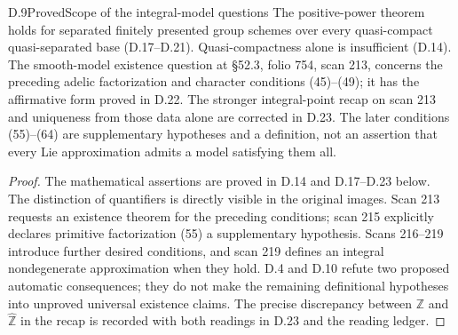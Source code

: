 \begin{statement}{D.9}{Proved}{Scope of the integral-model questions}
The positive-power theorem holds for separated finitely presented
group schemes over every quasi-compact quasi-separated base
(D.17--D.21). Quasi-compactness alone is insufficient (D.14).
The smooth-model existence question at \S52.3, folio 754,
scan 213, concerns the preceding adelic factorization and
character conditions (45)--(49); it has the affirmative form
proved in D.22. The stronger integral-point recap on scan 213
and uniqueness from those data alone are corrected in D.23.
The later conditions (55)--(64) are supplementary hypotheses
and a definition, not an assertion that every Lie approximation
admits a model satisfying them all.
\end{statement}
\begin{proof}
The mathematical assertions are proved in D.14 and D.17--D.23
below. The distinction of quantifiers is directly visible in
the original images. Scan 213 requests an existence theorem
for the preceding conditions; scan 215 explicitly declares
primitive factorization (55) a supplementary hypothesis.
Scans 216--219 introduce further desired conditions, and
scan 219 defines an integral nondegenerate approximation when
they hold. D.4 and D.10 refute two proposed automatic consequences;
they do not make the remaining definitional hypotheses into
unproved universal existence claims. The precise discrepancy
between $\mathbb Z$ and $\widehat{\mathbb Z}$ in the recap
is recorded with both readings in D.23 and the reading ledger.
\end{proof}

